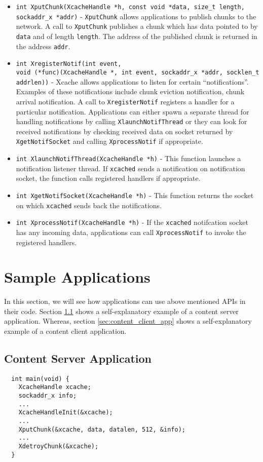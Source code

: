 \begin{itemize}
\item{\texttt{int XputChunk(XcacheHandle *h, const void *data, size\_t
  length, \\sockaddr\_x *addr)}} - \texttt{XputChunk} allows
  applications to publish chunks to the network. A call to
  \texttt{XputChunk} publishes a chunk which has data pointed to by
  \texttt{data} and of length \texttt{length}. The address of the
  published chunk is returned in the address \texttt{addr}.
\item{\texttt{int XregisterNotif(int event, \\void (*func)(XcacheHandle
    *, int event, sockaddr\_x *addr, socklen\_t addrlen))}} - Xcache
  allows applications to listen for certain
  ``notifications''. Examples of these notifications include chunk
  eviction notification, chunk arrival notification. A call to
  \texttt{XregisterNotif} registers a handler for a particular
  notification. Applications can either spawn a separate thread for
  handling notifications by calling \texttt{XlaunchNotifThread} or
  they can look for received notifications by checking received data
  on socket returned by \texttt{XgetNotifSocket} and calling
  \texttt{XprocessNotif} if appropriate.
\item{\texttt{int XlaunchNotifThread(XcacheHandle *h)}} - This
  function launches a notification listener thread. If
  \texttt{xcached} sends a notification on notification socket, the
  function calls registered handlers if appropriate.
\item{\texttt{int XgetNotifSocket(XcacheHandle *h)}} - This function
  returns the socket on which \texttt{xcached} sends back the
  notifications.
\item{\texttt{int XprocessNotif(XcacheHandle *h)}} - If the
  \texttt{xcached} notifcation socket has any incoming data,
  applications can call \texttt{XprocessNotif} to invoke the
  registered handlers.
\end{itemize}

\section{Sample Applications}
In this section, we will see how applications can use above mentioned
APIs in their code. Section \ref{sec:content_server_app} shows a
self-explanatory example of a content server application. Whereas,
section \ref{sec:content_client_app} shows a self-explanatory example
of a content client application.

\subsection{Content Server Application}
\label{sec:content_server_app}
      {
\begin{verbatim}
  int main(void) {
    XcacheHandle xcache;
    sockaddr_x info;
    ...
    XcacheHandleInit(&xcache);
    ...
    XputChunk(&xcache, data, datalen, 512, &info);
    ...
    XdetroyChunk(&xcache);
  }
\end{verbatim}
      }


